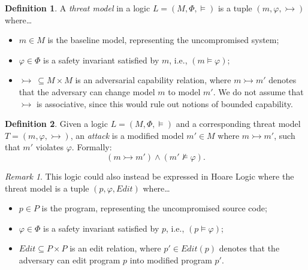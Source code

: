 \documentclass[11pt]{amsart}
\theoremstyle{definition}
\newtheorem{definition}{Definition}
\theoremstyle{remark}
\newtheorem*{remark}{Remark}
\newcommand{\nsat}{\not\models}
\newcommand{\adv}{\rightarrowtail}   %
\newcommand{\Edit}{\mathit{Edit}}
\begin{document}
\begin{definition}
A \emph{threat model} in a logic $L = (M, \Phi, \models)$ is a tuple $(m, \varphi, \adv)$ where\ldots
\begin{itemize}
  \item $m \in M$ is the baseline model, representing the uncompromised system;
  \item $\varphi \in \Phi$ is a safety invariant satisfied by $m$, i.e., $(m \models \varphi)$;
  \item $\adv\ \subseteq M \times M$ is an adversarial capability relation, where $m \adv m'$ denotes that the adversary can
  change model $m$ to model $m'$. We do not assume that $\adv$ is associative, since this would rule out
  notions of bounded capability.
\end{itemize}
\end{definition}

\begin{definition}
Given a logic $L = (M, \Phi, \models)$ and a corresponding threat model $T = (m, \varphi, \adv)$, an \emph{attack} is a modified
model $m' \in M$ where $m \adv m'$, such that $m'$ violates $\varphi$. Formally:
\[
  (m \adv m') \wedge (m' \nsat \varphi).
\]
\end{definition}

\begin{remark}
This logic could also instead be expressed in Hoare Logic where the threat model is a tuple $(p, \varphi, \Edit)$
where\ldots
\begin{itemize}
  \item $p \in P$ is the program, representing the uncompromised source code;
  \item $\varphi \in \Phi$ is a safety invariant satisfied by $p$, i.e., $(p \models \varphi)$;
  \item $\Edit \subseteq P \times P$ is an edit relation, where $p' \in \Edit(p)$ denotes that the adversary can edit
  program $p$ into modified program $p'$.
\end{itemize}
\end{remark}
\end{document}
